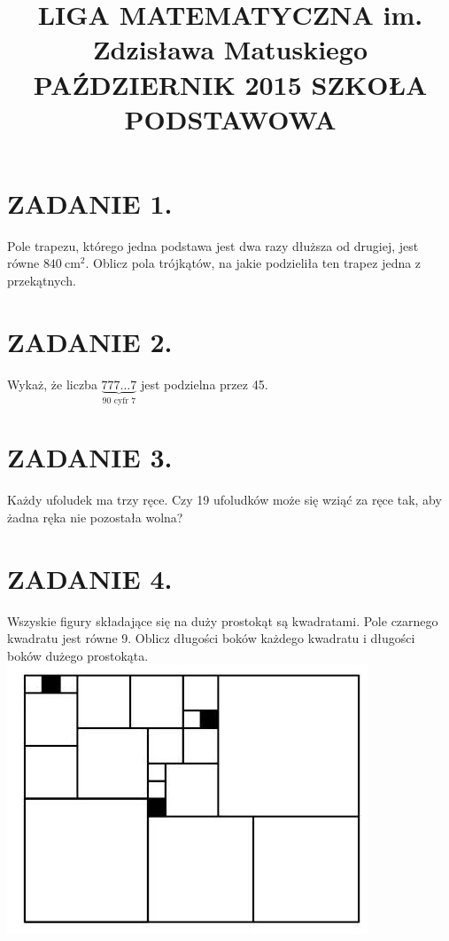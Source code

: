 \documentclass[10pt]{article}
\title{LIGA MATEMATYCZNA im. Zdzisława Matuskiego PAŹDZIERNIK 2015 SZKOŁA PODSTAWOWA }
\author{}
\date{}
\begin{document}
\maketitle
\section*{ZADANIE 1.}
Pole trapezu, którego jedna podstawa jest dwa razy dłuższa od drugiej, jest równe \(840 \mathrm{~cm}^{2}\). Oblicz pola trójkątów, na jakie podzieliła ten trapez jedna z przekątnych.

\section*{ZADANIE 2.}
Wykaż, że liczba \(\underbrace{777 \ldots 7}_{90 \text { cyfr } 7}\) jest podzielna przez 45.

\section*{ZADANIE 3.}
Każdy ufoludek ma trzy ręce. Czy 19 ufoludków może się wziąć za ręce tak, aby żadna ręka nie pozostała wolna?

\section*{ZADANIE 4.}
Wszyskie figury składające się na duży prostokąt są kwadratami. Pole czarnego kwadratu jest równe 9. Oblicz długości boków każdego kwadratu i długości boków dużego prostokąta.\\
\includegraphics[max width=\textwidth, center]{2024_11_21_868b5a0db8658c5e2e18g-1}
\end{document}
